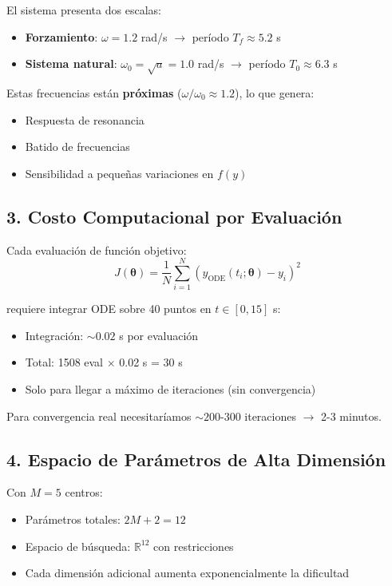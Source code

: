 \documentclass[11pt,a4paper]{article}
\begin{document}
El sistema presenta dos escalas:
\begin{itemize}
\item \textbf{Forzamiento}: $\omega = 1.2$ rad/s $\rightarrow$ período $T_f \approx 5.2$ s
\item \textbf{Sistema natural}: $\omega_0 = \sqrt{a} = 1.0$ rad/s $\rightarrow$ período $T_0 \approx 6.3$ s
\end{itemize}

Estas frecuencias están \textbf{próximas} ($\omega / \omega_0 \approx 1.2$), lo que genera:
\begin{itemize}
\item Respuesta de resonancia
\item Batido de frecuencias
\item Sensibilidad a pequeñas variaciones en $f(y)$
\end{itemize}

\subsection{3. Costo Computacional por Evaluación}

Cada evaluación de función objetivo:
\begin{equation}
J(\boldsymbol{\theta}) = \frac{1}{N} \sum_{i=1}^{N} \left( y_{\text{ODE}}(t_i; \boldsymbol{\theta}) - y_i \right)^2
\end{equation}

requiere integrar ODE sobre 40 puntos en $t \in [0, 15]$ s:

\begin{itemize}
\item Integración: $\sim 0.02$ s por evaluación
\item Total: 1508 eval $\times$ 0.02 s = 30 s
\item Solo para llegar a máximo de iteraciones (sin convergencia)
\end{itemize}

Para convergencia real necesitaríamos $\sim 200$-$300$ iteraciones $\rightarrow$ 2-3 minutos.

\subsection{4. Espacio de Parámetros de Alta Dimensión}

Con $M = 5$ centros:
\begin{itemize}
\item Parámetros totales: $2M + 2 = 12$
\item Espacio de búsqueda: $\mathbb{R}^{12}$ con restricciones
\item Cada dimensión adicional aumenta exponencialmente la dificultad
\end{itemize}
\end{document}
